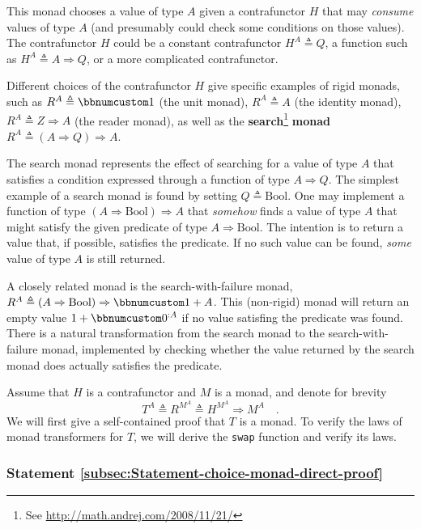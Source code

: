This monad chooses a value of type $A$ given a contrafunctor $H$
that may \emph{consume} values of type $A$ (and presumably could
check some conditions on those values). The contrafunctor $H$ could
be a constant contrafunctor $H^{A}\triangleq Q$, a function such
as $H^{A}\triangleq A\Rightarrow Q$, or a more complicated contrafunctor.

Different choices of the contrafunctor $H$ give specific examples
of rigid monads, such as $R^{A}\triangleq\bbnum 1$ (the unit monad),
$R^{A}\triangleq A$ (the identity monad), $R^{A}\triangleq Z\Rightarrow A$
(the reader monad), as well as the \textbf{search}\footnote{See \href{http://math.andrej.com/2008/11/21/}{http://math.andrej.com/2008/11/21/}}\textbf{
monad} $R^{A}\triangleq\left(A\Rightarrow Q\right)\Rightarrow A$. 

The search monad represents the effect of searching for a value of
type $A$ that satisfies a condition expressed through a function
of type $A\Rightarrow Q$. The simplest example of a search monad
is found by setting $Q\triangleq\text{Bool}$. One may implement a
function of type $\left(A\Rightarrow\text{Bool}\right)\Rightarrow A$
that \emph{somehow} finds a value of type $A$ that might satisfy
the given predicate of type $A\Rightarrow\text{Bool}$. The intention
is to return a value that, if possible, satisfies the predicate. If
no such value can be found, \emph{some} value of type $A$ is still
returned.

A closely related monad is the search-with-failure monad, $R^{A}\triangleq\left(A\Rightarrow\text{Bool}\right)\Rightarrow\bbnum 1+A$.
This (non-rigid) monad will return an empty value $1+\bbnum 0^{:A}$
if no value satisfing the predicate was found. There is a natural
transformation from the search monad to the search-with-failure monad,
implemented by checking whether the value returned by the search monad
does actually satisfies the predicate.

Assume that $H$ is a contrafunctor and $M$ is a monad, and denote
for brevity 
\[
T^{A}\triangleq R^{M^{A}}\triangleq H^{M^{A}}\Rightarrow M^{A}\quad.
\]
We will first give a self-contained proof that $T$ is a monad. To
verify the laws of monad transformers for $T$, we will derive the
\lstinline!swap! function
and verify its laws.

\subsubsection{Statement \label{subsec:Statement-choice-monad-direct-proof}\ref{subsec:Statement-choice-monad-direct-proof}}

